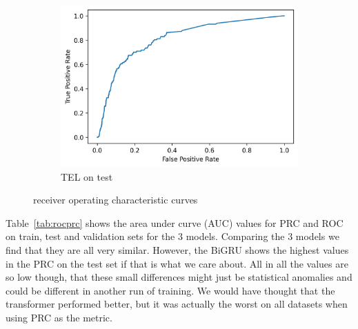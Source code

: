 \documentclass[utf8x]{ctexart}
\begin{document}
\begin{figure}[htb]
\begin{subfigure}[b]{0.32\textwidth}
    \includegraphics[width=\textwidth]{../images/Transformer_test_roc.png}
    \caption{TEL on test}
    \label{fig:Transformer_roc_test}
  \end{subfigure}

  \caption{receiver operating characteristic curves}
  \label{fig:roc}
\end{figure}

Table~\ref{tab:rocprc} shows the area under curve (AUC) values for PRC and ROC on train, test and validation sets for the 3 models. Comparing the 3 models we find that they are all very similar. However, the BiGRU shows the highest values in the PRC on the test set if that is what we care about. All in all the values are so low though, that these small differences might just be statistical anomalies and could be different in another run of training. We would have thought that the transformer performed better, but it was actually the worst on all datasets when using PRC as the metric.
\end{document}

